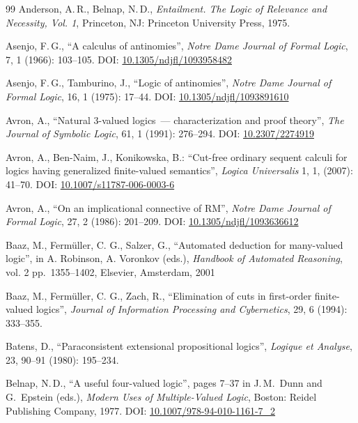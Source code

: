 \documentclass[11pt,a4paper,titlepage]{article}
\theoremstyle{definition}
\newcommand{\3}{\vspace{.3in}}
\newcommand{\2}{\vspace{.2in}}
\newcommand{\1}{\vspace{.1in}}
\newcommand{\5}{\vspace{.05in}}
\newcommand\DOI[2]{DOI: \href{#1#2}{#2}}
\newcommand{\ts}{\,}
\begin{document}
\begin{thebibliography}{99}
Anderson, A.\ts R., Belnap, N.\ts D.,  \textit{Entailment. The Logic of Relevance and Necessity, Vol. 1}, Princeton, NJ: Princeton University Press, 1975.

Asenjo, F.\ts G., ``A calculus of antinomies'', \textit{Notre Dame Journal of Formal Logic}, 7, 1 (1966): 103--105.
\DOI{http://dx.doi.org/}{10.1305/ndjfl/1093958482}

Asenjo, F.\ts G., Tamburino, J., ``Logic of antinomies'', \textit{Notre Dame Journal of Formal Logic}, 16, 1 (1975): 17--44. 
\DOI{http://dx.doi.org/}{10.1305/ndjfl/1093891610}

Avron, A., ``Natural 3-valued logics~--- characterization and proof theory'', \textit{The Journal of Symbolic Logic}, 61, 1 (1991): 276--294.  
\DOI{http://dx.doi.org/}{10.2307/2274919}

Avron, A., Ben-Naim, J., Konikowska, B.:  ``Cut-free ordinary sequent calculi for logics having generalized finite-valued semantics'',  \textit{Logica Universalis} 1, 1, (2007): 41--70.  \DOI{http://dx.doi.org/}{10.1007/s11787-006-0003-6}

Avron, A., ``On an implicational connective of RM'', \textit{Notre Dame Journal of Formal Logic}, 27, 2 (1986): 201--209.
\DOI{http://dx.doi.org/}{10.1305/ndjfl/1093636612}

Baaz, M., Ferm\"uller, C. G., Salzer, G., ``Automated deduction for many-valued logic'',
in A. Robinson, A. Voronkov (eds.),  \textit{Handbook of Automated Reasoning}, vol. 2
pp.~1355--1402, Elsevier, Amsterdam, 2001


Baaz, M., Ferm\"uller, C. G., Zach, R., ``Elimination of cuts in first-order finite-valued logics'',
\textit{Journal of Information Processing and Cybernetics}, 29, 6 (1994): 333--355.


Batens, D., ``Paraconsistent extensional propositional logics'', \textit{Logique et Analyse}, 23, 90--91 (1980): 195--234.

 Belnap, N.\ts D., ``A useful four-valued logic'', pages 7--37 in J.\ts M.~Dunn and G.~Epstein (eds.), \textit{Modern Uses of Multiple-Valued Logic}, Boston: Reidel Publishing Company, 1977. \DOI{http://dx.doi.org/}{10.1007/978-94-010-1161-7\_2}


\end{thebibliography}
\end{document}

